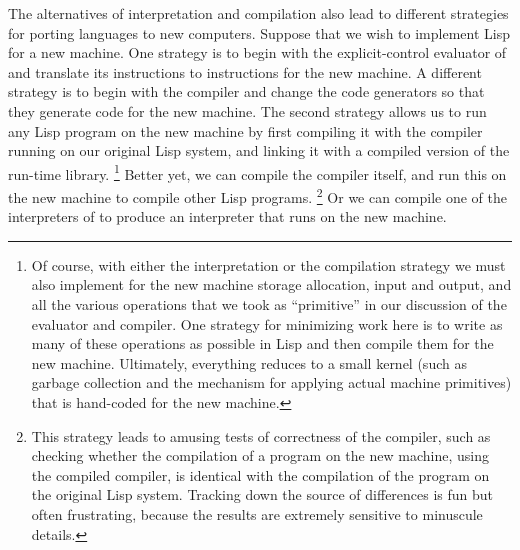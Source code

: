 The alternatives of interpretation and compilation also lead to different strategies for porting languages to new computers.
Suppose that we wish to implement Lisp for a new machine.
One strategy is to begin with the explicit-control evaluator of  and translate its instructions to instructions for the new machine.
A different strategy is to begin with the compiler and change the code generators so that they generate code for the new machine.
The second strategy allows us to run any Lisp program on the new machine by first compiling it with the compiler running on our original Lisp system, and linking it with a compiled version of the run-time library.%
\footnote{
	Of course, with either the interpretation or the compilation strategy we must also implement for the new machine storage allocation, input and output, and all the various operations that we took as “primitive” in our discussion of the evaluator and compiler.
	One strategy for minimizing work here is to write as many of these operations as possible in Lisp and then compile them for the new machine.
	Ultimately, everything reduces to a small kernel (such as garbage collection and the mechanism for applying actual machine primitives) that is hand-coded for the new machine.
}
Better yet, we can compile the compiler itself, and run this on the new machine to compile other Lisp programs.%
\footnote{
	This strategy leads to amusing tests of correctness of the compiler, such as checking whether the compilation of a program on the new machine, using the compiled compiler, is identical with the compilation of the program on the original Lisp system.
	Tracking down the source of differences is fun but often frustrating, because the results are extremely sensitive to minuscule details.
}
Or we can compile one of the interpreters of  to produce an interpreter that runs on the new machine.



